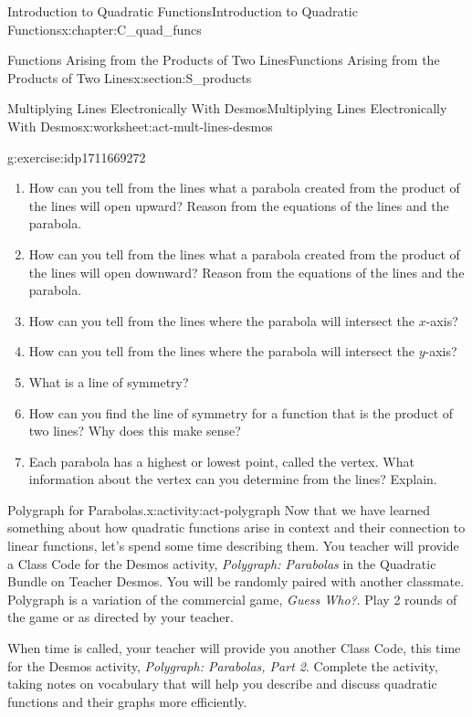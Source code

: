 \documentclass[oneside,10pt,]{book}
\newcommand{\pubtitle}[1]{\textsl{#1}}
\numberwithin{equation}{chapter}
\begin{document}
\begin{chapterptx}{Introduction to Quadratic Functions}{}{Introduction to Quadratic Functions}{}{}{x:chapter:C_quad_funcs}
\begin{sectionptx}{Functions Arising from the Products of Two Lines}{}{Functions Arising from the Products of Two Lines}{}{}{x:section:S_products}
\begin{worksheet-subsection}{Multiplying Lines Electronically With Desmos}{}{Multiplying Lines Electronically With Desmos}{}{}{x:worksheet:act-mult-lines-desmos}
\begin{divisionexercise}{6}{}{}{g:exercise:idp1711669272}
\begin{enumerate}[font=\bfseries,label=(\alph*),ref=\alph*]
\begin{enumerate}[font=\bfseries,label=(\roman*),ref=\theenumi.\roman*]
\item{}Both lines have positive slopes.%
\item{}Both lines have negative slopes. (What additional change do you need to make?)%
\item{}One line has a positive slope and the other line has a negative slope.%
\end{enumerate}
\item{}How can you tell from the lines what a parabola created from the product of the lines will open upward? Reason from the equations of the lines and the parabola.%
\item{}How can you tell from the lines what a parabola created from the product of the lines will open downward? Reason from the equations of the lines and the parabola.%
\item{}How can you tell from the lines where the parabola will intersect the \(x\)-axis?%
\item{}How can you tell from the lines where the parabola will intersect the \(y\)-axis?%
\item{}What is a line of symmetry?%
\item{}How can you find the line of symmetry for a function that is the product of two lines? Why does this make sense?%
\item{}Each parabola has a highest or lowest point, called the vertex. What information about the vertex can you determine from the lines? Explain.%
\end{enumerate}
\end{divisionexercise}%
\end{worksheet-subsection}
\restoregeometry
\begin{activity}{Polygraph for Parabolas.}{x:activity:act-polygraph}%
Now that we have learned something about how quadratic functions arise in context and their connection to linear functions, let's spend some time describing them. You teacher will provide a Class Code for the Desmos activity, \pubtitle{Polygraph: Parabolas} in the Quadratic Bundle on Teacher Desmos. You will be randomly paired with another classmate. Polygraph is a variation of the commercial game, \pubtitle{Guess Who?}. Play 2 rounds of the game or as directed by your teacher.%
\par
When time is called, your teacher will provide you another Class Code, this time for the Desmos activity, \pubtitle{Polygraph: Parabolas, Part 2}. Complete the activity, taking notes on vocabulary that will help you describe and discuss quadratic functions and their graphs more efficiently.%

\end{activity}
\end{sectionptx}
\end{chapterptx}
\end{document}
